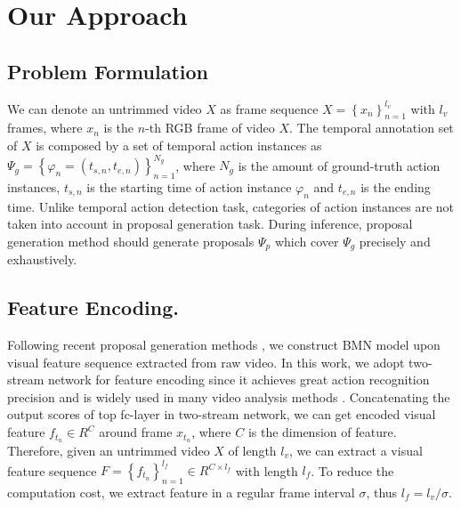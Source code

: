 \documentclass[10pt,twocolumn,letterpaper]{article}
\begin{document}
\section{Our Approach}

\subsection{Problem Formulation}

We can denote an untrimmed video $X$ as frame sequence $X=\left \{ x_n \right \}_{n=1}^{l_v}$ with $l_v$  frames, where $x_n$ is the $n$-th RGB frame of video $X$.
%
The temporal annotation set of $X$ is composed by
a set of temporal action instances as  $\Psi_g  = \left \{ \varphi  _n=\left (t_{s,n},t_{e,n}   \right ) \right \}_{n=1}^{N_g}$, where $N_g$ is the amount of ground-truth action instances,  $t_{s,n}$ is the starting time of action instance $\varphi_n$ and $t_{e,n} $ is the ending time.
%
Unlike temporal action detection task, categories of action instances are not taken into account in proposal generation task.
%
During inference, proposal generation method should generate proposals $\Psi_p$ which cover $\Psi_g$ precisely and exhaustively.


\subsection{Feature Encoding.}

Following recent proposal generation methods \cite{sst_buch_cvpr17, escorcia2016daps, gao2017turn,lin2018bsn}, we construct BMN model upon visual feature sequence extracted from raw video. 
%
In this work, we adopt two-stream network \cite{simonyan2014two} for feature encoding since it achieves great action recognition precision and is widely used in many video analysis methods \cite{gao2017cascaded,ssad,zhao2017temporal}.
%
Concatenating the output scores of top fc-layer in two-stream network, we can get encoded visual feature $f_{t_n} \in R^{C}$ around frame $x_{t_n}$, where $C$ is the dimension of feature.
%
Therefore, given an untrimmed video $X$ of length $l_v$, we can extract a visual feature sequence $F=\left \{ f_{t_n} \right \}_{n=1}^{l_f} \in R^{C\times l_f}$ with length $l_f$.
%
To reduce the computation cost, we extract feature in a regular frame interval $\sigma$, thus $l_f=l_v/\sigma$.
\end{document}
